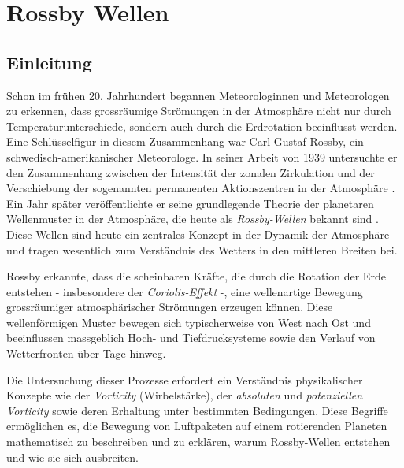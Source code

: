 %
%
%

\chapter{Rossby Wellen\label{chapter:rossby}}
\begin{refsection}


    \section{Einleitung}

    Schon im frühen 20. Jahrhundert begannen Meteorologinnen und Meteorologen zu erkennen, dass grossräumige Strömungen in der Atmosphäre nicht nur durch Temperaturunterschiede, sondern auch durch die Erdrotation beeinflusst werden.  
    Eine Schlüsselfigur in diesem Zusammenhang war Carl-Gustaf Rossby, ein schwedisch-amerikanischer Meteorologe.  
    In seiner Arbeit von 1939 untersuchte er den Zusammenhang zwischen der Intensität der zonalen Zirkulation und der Verschiebung der sogenannten permanenten Aktionszentren in der Atmosphäre \cite{rossby:1939relation}.  
    Ein Jahr später veröffentlichte er seine grundlegende Theorie der planetaren Wellenmuster in der Atmosphäre, die heute als \emph{Rossby-Wellen} bekannt sind \cite{rossby:1940planetary}.  
    Diese Wellen sind heute ein zentrales Konzept in der Dynamik der Atmosphäre und tragen wesentlich zum Verständnis des Wetters in den mittleren Breiten bei.  
    
    Rossby erkannte, dass die scheinbaren Kräfte, die durch die Rotation der Erde entstehen - insbesondere der \emph{Coriolis-Effekt} -, eine wellenartige Bewegung grossräumiger atmosphärischer Strömungen erzeugen können.  
    Diese wellenförmigen Muster bewegen sich typischerweise von West nach Ost und beeinflussen massgeblich Hoch- und Tiefdrucksysteme sowie den Verlauf von Wetterfronten über Tage hinweg.  
    
    Die Untersuchung dieser Prozesse erfordert ein Verständnis physikalischer Konzepte wie der \emph{Vorticity} (Wirbelstärke), der \emph{absoluten} und \emph{potenziellen Vorticity} sowie deren Erhaltung unter bestimmten Bedingungen.  
    Diese Begriffe ermöglichen es, die Bewegung von Luftpaketen auf einem rotierenden Planeten mathematisch zu beschreiben und zu erklären, warum Rossby-Wellen entstehen und wie sie sich ausbreiten.  
    

\end{refsection}
